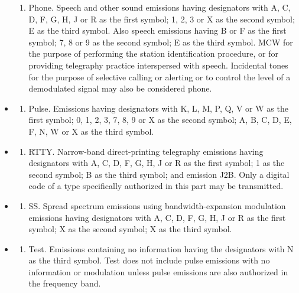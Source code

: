 \documentclass[
  letterpaper,
  DIV=11,
  numbers=noendperiod]{scrreport}
\providecommand{\tightlist}{%
  \setlength{\itemsep}{0pt}\setlength{\parskip}{0pt}}\usepackage{longtable,booktabs,array}
\begin{document}
\begin{itemize}
\begin{enumerate}
  \tightlist
  \item
    Phone. Speech and other sound emissions having designators with A,
    C, D, F, G, H, J or R as the first symbol; 1, 2, 3 or X as the
    second symbol; E as the third symbol. Also speech emissions having B
    or F as the first symbol; 7, 8 or 9 as the second symbol; E as the
    third symbol. MCW for the purpose of performing the station
    identification procedure, or for providing telegraphy practice
    interspersed with speech. Incidental tones for the purpose of
    selective calling or alerting or to control the level of a
    demodulated signal may also be considered phone.
  \end{enumerate}
\item
  \begin{enumerate}
  \def\labelenumi{(\arabic{enumi})}
  \setcounter{enumi}{5}
  \tightlist
  \item
    Pulse. Emissions having designators with K, L, M, P, Q, V or W as
    the first symbol; 0, 1, 2, 3, 7, 8, 9 or X as the second symbol; A,
    B, C, D, E, F, N, W or X as the third symbol.
  \end{enumerate}
\item
  \begin{enumerate}
  \def\labelenumi{(\arabic{enumi})}
  \setcounter{enumi}{6}
  \tightlist
  \item
    RTTY. Narrow-band direct-printing telegraphy emissions having
    designators with A, C, D, F, G, H, J or R as the first symbol; 1 as
    the second symbol; B as the third symbol; and emission J2B. Only a
    digital code of a type specifically authorized in this part may be
    transmitted.
  \end{enumerate}
\item
  \begin{enumerate}
  \def\labelenumi{(\arabic{enumi})}
  \setcounter{enumi}{7}
  \tightlist
  \item
    SS. Spread spectrum emissions using bandwidth-expansion modulation
    emissions having designators with A, C, D, F, G, H, J or R as the
    first symbol; X as the second symbol; X as the third symbol.
  \end{enumerate}
\item
  \begin{enumerate}
  \def\labelenumi{(\arabic{enumi})}
  \setcounter{enumi}{8}
  \tightlist
  \item
    Test. Emissions containing no information having the designators
    with N as the third symbol. Test does not include pulse emissions
    with no information or modulation unless pulse emissions are also
    authorized in the frequency band.
  \end{enumerate}
\end{itemize}
\end{document}
